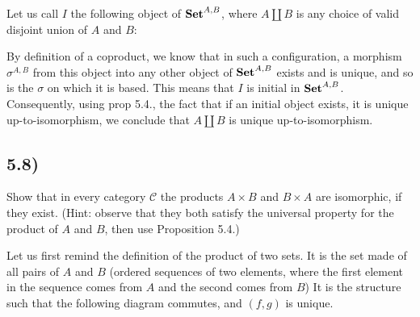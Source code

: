 \documentclass[12pt, letterpaper, twoside]{report}
\begin{document}
Let us call $I$ the following object of $\text{\textbf{Set}}^{A,B}$, where $A \coprod B$ is any choice of valid disjoint union of $A$ and $B$:


By definition of a coproduct, we know that in such a configuration, a morphism $\sigma^{A,B}$ from this object into any other object of $\text{\textbf{Set}}^{A,B}$ exists and is unique, and so is the $\sigma$ on which it is based. This means that $I$ is initial in $\text{\textbf{Set}}^{A,B}$. Consequently, using prop 5.4., the fact that if an initial object exists, it is unique up-to-isomorphism, we conclude that $A \coprod B$ is unique up-to-isomorphism.



\subsection*{5.8)}

Show that in every category $\mathcal{C}$ the products $A \times B$ and $B \times A$ are isomorphic, if they exist. (Hint: observe that they both satisfy the universal property for the product of $A$ and $B$, then use Proposition 5.4.)

Let us first remind the definition of the product of two sets. It is the set made of all pairs of $A$ and $B$ (ordered sequences of two elements, where the first element in the sequence comes from $A$ and the second comes from $B$) It is the structure such that the following diagram commutes, and $(f,g)$ is unique.

\end{document}
